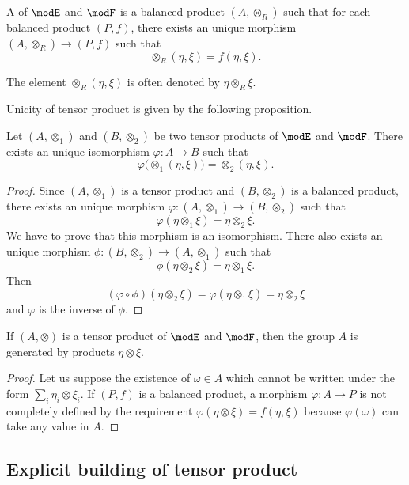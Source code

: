 \begin{definition}
A  of $\modE$ and $\modF$ is a balanced product $(A,\otimes_R)$ such that for each balanced product $(P,f)$, there exists an unique morphism $(A,\otimes_R)\to(P,f)$ such that
\[ 
  \otimes_R(\eta,\xi)=f(\eta,\xi).
\]

\end{definition}
The element $\otimes_R(\eta,\xi)$ is often denoted by $\eta\otimes_R\xi$.

Unicity of tensor product is given by the following proposition.

\begin{proposition}
Let $(A,\otimes_1)$ and $(B,\otimes_2)$ be two tensor products of $\modE$ and $\modF$. There exists an unique isomorphism $\varphi\colon A\to B$ such that
\[ 
  \varphi\big( \otimes_1(\eta,\xi) \big)=\otimes_2(\eta,\xi).
\]

\end{proposition}

\begin{proof}
Since $(A,\otimes_1)$ is a tensor product and $(B,\otimes_2)$ is a balanced product, there exists an unique morphism $\varphi\colon (A,\otimes_1)\to (B,\otimes_2)$ such that
\[ 
  \varphi(\eta\otimes_1\xi)=\eta\otimes_2\xi.
\]
We have to prove that this morphism is an isomorphism. There also exists an unique morphism $\phi\colon (B,\otimes_2)\to (A,\otimes_1)$ such that
\[ 
  \phi(\eta\otimes_2\xi)=\eta\otimes_1\xi.
\]
Then
\[ 
   (\varphi\circ\phi)(\eta\otimes_2\xi)=\varphi(\eta\otimes_1\xi)=\eta\otimes_2\xi  
\]
and $\varphi$ is the inverse of $\phi$.
\end{proof}

\begin{proposition}
If $(A,\otimes)$ is a tensor product of $\modE$ and $\modF$, then the group $A$ is generated by products $\eta\otimes\xi$.
\end{proposition}

\begin{proof}
Let us suppose the existence of $\omega\in A$ which cannot be written under the form $\sum_i\eta_i\otimes\xi_i$. If $(P,f)$ is a balanced product, a morphism $\varphi\colon A\to P$ is not completely defined by the requirement $\varphi(\eta\otimes\xi)=f(\eta,\xi)$ because $\varphi(\omega)$ can take any value in $A$.

\end{proof} 

\subsection{Explicit building of tensor product}

